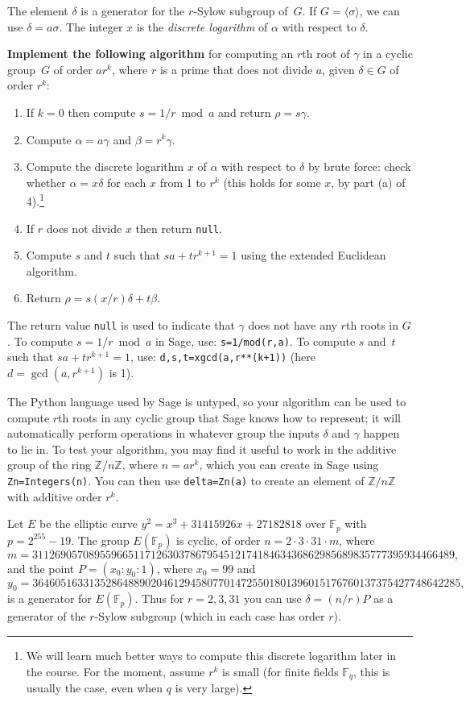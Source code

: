 \documentclass[11pt]{article}
\newcommand{\Fp}{\mathbb{F}_p}
\newcommand{\Fq}{\mathbb{F}_q}
\newcommand{\Z}{\mathbb{Z}}
\begin{document}
\noindent
The element $\delta$ is a generator for the $r$-Sylow subgroup of~$G$.  If $G=\langle\sigma\rangle$, we can use $\delta=a\sigma$.
The integer $x$ is the \emph{discrete logarithm} of $\alpha$ with respect to $\delta$.

\bigskip
\noindent
\textbf{Implement the following algorithm} for computing an $r$th root of $\gamma$ in a cyclic group~$G$ of order $ar^k$, where $r$ is a prime that does not divide $a$, given $\delta\in G$ of order $r^k$:
\begin{enumerate}
\setlength{\itemsep}{-1pt}
\item If $k=0$ then compute $s=1/r\bmod a$ and return $\rho = s\gamma$.
\item Compute $\alpha=a\gamma$ and $\beta=r^k\gamma$.
\item Compute the discrete logarithm $x$ of $\alpha$ with respect to $\delta$ by brute force: check whether $\alpha=x\delta$ for each $x$ from 1 to $r^k$ (this holds for some $x$, by part (a) of 4).\footnote{We will learn much better ways to compute this discrete logarithm later in the course.  For the moment, assume $r^k$ is small (for finite fields $\Fq$, this is usually the case, even when $q$ is very large).}
\item If $r$ does not divide $x$ then return \texttt{null}.
\item Compute $s$ and $t$ such that $sa+tr^{k+1}=1$ using the extended Euclidean algorithm.
\item Return $\rho=s(x/r)\delta+t\beta$.
\end{enumerate}
The return value \texttt{null} is used to indicate that $\gamma$ does not have any $r$th roots in $G$.
To compute $s=1/r\bmod a$ in Sage, use: \texttt{s=1/mod(r,a)}.
To compute $s$ and~$t$ such that $sa+tr^{k+1}=1$, use: \texttt{d,s,t=xgcd(a,r**(k+1))} (here $d=\gcd(a,r^{k+1})$ is 1).

The Python language used by Sage is untyped, so your algorithm can be used to compute $r$th roots in any cyclic group that Sage knows how to represent; it will automatically perform operations in whatever group the inputs $\delta$ and $\gamma$ happen to lie in.
To test your algorithm, you may find it useful to work in the additive group of the ring $\Z/n\Z$, where $n=ar^k$, which you can create in Sage using \texttt{Zn=Integers(n)}.
You can then use \texttt{delta=Zn(a)} to create an element of $\Z/n\Z$ with additive order $r^k$.

\bigskip

Let $E$ be the elliptic curve $y^2=x^3+31415926x+27182818$ over $\Fp$ with $p=2^{255}-19$.
The group $E(\Fp)$ is cyclic, of order $n = 2\cdot 3\cdot 31\cdot m$, where
\small
$$m=311269057089559665117126303786795451217418463436862985689835777395934466489,$$
\normalsize
and the point $P=(x_0:y_0:1)$, where $x_0=99$ and
\small
$$y_0=3646051633135286488902046129458077014725501801396015176760137375427748642285,$$
\normalsize
is a generator for $E(\Fp)$.  Thus for $r=2,3,31$ you can use $\delta = (n/r)P$ as a generator of the $r$-Sylow subgroup (which in each case has order $r$).
\end{document}
